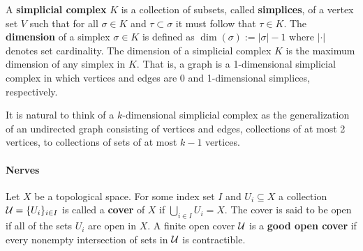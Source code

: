 

A \textbf{simplicial complex} $K$ is a collection of subsets, called \textbf{simplices}, of a vertex set $V$ such that for all $\sigma\in K$ and $\tau\subset\sigma$ it must follow that $\tau\in K$.
The \textbf{dimension} of a simplex $\sigma\in K$ is defined as $\dim(\sigma) := |\sigma|-1$ where $|\cdot|$ denotes set cardinality.
The dimension of a simplicial complex $K$ is the maximum dimension of any simplex in $K$.
That is, a graph is a 1-dimensional simplicial complex in which vertices and edges are 0 and 1-dimensional simplices, respectively.


It is natural to think of a $k$-dimensional simplicial complex as the generalization of an undirected graph consisting of vertices and edges, collections of at most 2 vertices, to collections of sets of at most $k-1$ vertices.

\paragraph{Nerves}

Let $X$ be a topological space.
For some index set $I$ and $U_i\subseteq X$ a collection $\mathcal{U} = \{U_i\}_{i\in I}$ is called a \textbf{cover} of $X$ if $\bigcup_{i\in I} U_i = X$.
The cover is said to be open if all of the sets $U_i$ are open in $X$.
A finite open cover $\mathcal{U}$ is a \textbf{good open cover} if every nonempty intersection of sets in $\mathcal{U}$ is contractible.

